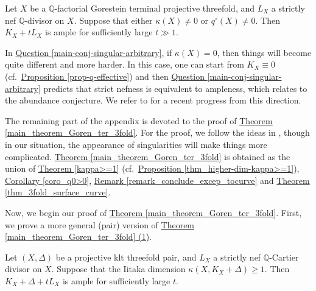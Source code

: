 \begin{cor}\label{main_Goren_ter_3fold}
Let $X$ be a $\mathbb{Q}$-factorial Gorestein terminal projective threefold, and $L_X$ a strictly nef $\mathbb{Q}$-divisor on $X$.
Suppose that either $\kappa(X)\neq 0$ or $q^{\circ}(X)\neq 0$.
Then $K_X+tL_X$ is ample for sufficiently large $t\gg 1$.
\end{cor}

In {\hyperref[main-conj-singular-arbitrary]{Question  \ref*{main-conj-singular-arbitrary}}},	if $\kappa(X)=0$,  then things will become quite different and more harder.
In this case, one can start from  $K_X\equiv 0$ (cf.~{\hyperref[prop-q-effective]{Proposition  \ref*{prop-q-effective}}}) and then
{\hyperref[main-conj-singular-arbitrary]{Question  \ref*{main-conj-singular-arbitrary}}} predicts that strict nefness is equivalent to ampleness, which relates to the abundance conjecture.
 We refer to \cite{LS20} for a recent progress from this direction.


The remaining part of the appendix is devoted to the proof of {\hyperref[main_theorem_Goren_ter_3fold]{Theorem   \ref*{main_theorem_Goren_ter_3fold}}}. 
For the proof, we follow the ideas in \cite{CCP08}, though in our situation, the appearance of singularities will make things more complicated. 
{\hyperref[main_theorem_Goren_ter_3fold]{Theorem   \ref*{main_theorem_Goren_ter_3fold}}} is obtained as the union of {\hyperref[kappa>=1]{Theorem   \ref*{kappa>=1}}}   (cf.~{\hyperref[thm_higher-dim-kappa>=1]{Proposition   \ref*{thm_higher-dim-kappa>=1}}}),
{\hyperref[coro_q0>0]{Corollary   \ref*{coro_q0>0}}}, {\hyperref[remark_conclude_excep_tocurve]{Remark   \ref*{remark_conclude_excep_tocurve}}}  and {\hyperref[thm_3fold_surface_curve]{Theorem    \ref*{thm_3fold_surface_curve}}}.






Now, we begin our proof of {\hyperref[main_theorem_Goren_ter_3fold]{Theorem   \ref*{main_theorem_Goren_ter_3fold}}}.
First, we prove a more general (pair) version of {\hyperref[main_theorem_Goren_ter_3fold]{Theorem   \ref*{main_theorem_Goren_ter_3fold} (1)}}.

\begin{thm}\label{kappa>=1}
Let $(X,\Delta)$ be a projective klt threefold pair, and $L_X$ a strictly nef $\mathbb{Q}$-Cartier divisor on $X$.
Suppose that the Iitaka dimension  $\kappa(X,K_X+\Delta)\geqslant 1$.
Then $K_X+\Delta+tL_X$ is ample for sufficiently large $t$.
\end{thm}

